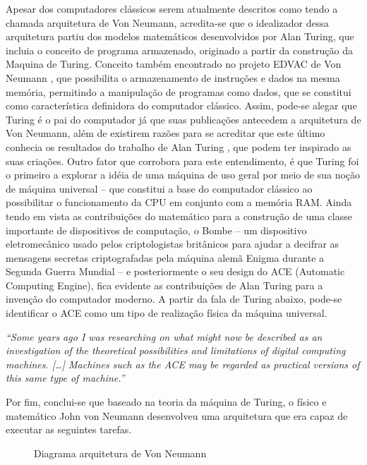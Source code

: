 Apesar dos computadores clássicos serem atualmente descritos como tendo a chamada arquitetura de Von Neumann, acredita-se que o idealizador dessa arquitetura partiu dos modelos matemáticos desenvolvidos por Alan Turing, que incluia o conceito de programa armazenado, originado a partir da construção da Maquina de Turing. Conceito também encontrado no projeto EDVAC de Von Neumann \cite{9}, que possibilita o armazenamento de instruções e dados na mesma memória, permitindo a manipulação de programas como dados, que se constitui como característica definidora do computador clássico. Assim, pode-se alegar que Turing é o pai do computador já que suas publicações antecedem a arquitetura de Von Neumann, além de existirem razões para se acreditar que este último conhecia os resultados do trabalho de Alan Turing \cite{10}, que podem ter inspirado as suas criações. Outro fator que corrobora para este entendimento, é que Turing foi o primeiro a explorar a idéia de uma máquina de uso geral por meio de sua noção de máquina universal – que constitui a base do computador clássico ao possibilitar o funcionamento da CPU em conjunto com a memória RAM. Ainda tendo em vista as contribuições do matemático para a construção de uma classe importante de dispositivos de computação, o Bombe – um dispositivo eletromecânico usado pelos criptologistas britânicos para ajudar a decifrar as mensagens secretas criptografadas pela máquina alemã Enigma durante a Segunda Guerra Mundial – e posteriormente o seu design do ACE (Automatic Computing Engine), fica evidente as contribuições de Alan Turing para a invenção do computador moderno. A partir da fala de Turing abaixo, pode-se identificar o ACE como um tipo de realização física da máquina universal.

\textit{
  ``Some years ago I was researching on what might now be described as an investigation of the theoretical possibilities and limitations of digital computing machines. […] Machines such as the ACE may be regarded as practical versions of this same type of machine.'' \cite{11}
}

Por fim, conclui-se que baseado na teoria da máquina de Turing, o físico e matemático John von Neumann desenvolveu uma arquitetura que era capaz de executar as seguintes tarefas.

\vspace{1cm}
\begin{figure}[H] \centering 
  \caption{\label{fig:1} Diagrama arquitetura de Von Neumann} 
\end{figure}

